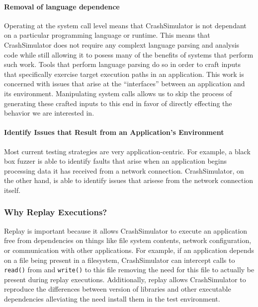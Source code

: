         \paragraph{Removal of language dependence}

        Operating at the system call level means that CrashSimulator is not
        dependant on a particular programming language or runtime.  This means
        that CrashSimulator does not require any complext language parsing and
        analysis code while still allowing it to posess many of the benefits of
        systems that perform such work.  Tools that perform language parsing do
        so in order to craft inputs that specifically exercise target execution
        paths in an application.  This work is concerned with issues that arise
        at the ``interfaces'' between an application and its environment.
        Manipulating system calls allows us to skip the process of generating
        these crafted inputs to this end in favor of directly effecting the
        behavior we are interested in.

        \paragraph{Identify Issues that Result from an Application's Environment}

        Most current testing strategies are very application-centric.  For
        example, a black box fuzzer is able to identify faults that arise when
        an application begins processing data it has received from a network
        connection. CrashSimulator, on the other hand, is able to identify
        issues that arisese from the network connection itself.

    \subsubsection{Why Replay Executions?}

        Replay is important because it allows CrashSimulator to execute an
        application free from dependencies on things like file system contents,
        network configuration, or communication with other applications.  For
        example, if an application depends on a file being present in a filesystem,
        CrashSimulator can intercept calls to {\tt read()} from and {\tt write()} to
        this file removing the need for this file to actually be present during
        replay executions. Additionally, replay allows CrashSimulator to reproduce
        the differences between version of libraries and other executable
        dependencies alleviating the need install them in the test environment.

